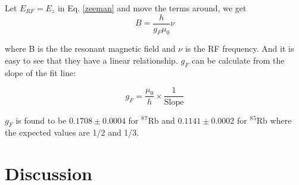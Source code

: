 \documentclass[prb,preprint]{revtex4-1}
\begin{document}
Let $E_{RF}=E_{z}$ in Eq. \ref{zeeman} and move the terms around, we get
\begin{equation}
B=\frac{h}{g_{F}\mu_{0}}\nu
\label{bandf}
\end{equation}

where B is the the resonant magnetic field and $\nu$ is the RF frequency. And it is easy to see that they have a linear relationship. $g_{F}$ can be calculate from the slope of the fit line:

\begin{equation}
g_{F}=\frac{\mu_{0}}{h} \times \frac{1}{\textrm{Slope}}
\label{gf}
\end{equation}

$g_{F}$ is found to be $0.1708\pm0.0004$ for $^8$$^7$Rb and $0.1141\pm0.0002$ for $^8$$^5$Rb where the expected values are 1/2 and 1/3.



\section{Discussion}



\end{document}
